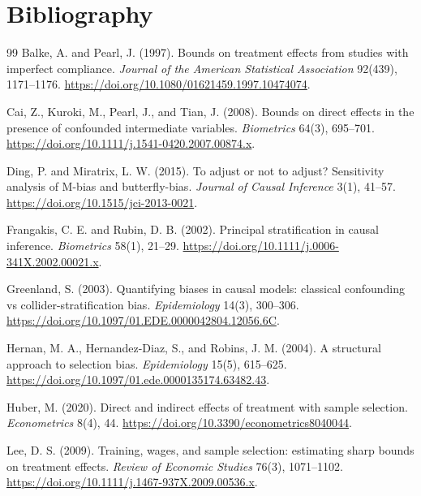 \documentclass[11pt]{article}
\theoremstyle{definition}
\theoremstyle{plain}
\theoremstyle{remark}
\begin{document}
\section*{Bibliography}
\begin{thebibliography}{99}
Balke, A. and Pearl, J. (1997).
Bounds on treatment effects from studies with imperfect compliance.
\emph{Journal of the American Statistical Association} 92(439), 1171--1176.
\url{https://doi.org/10.1080/01621459.1997.10474074}.

Cai, Z., Kuroki, M., Pearl, J., and Tian, J. (2008).
Bounds on direct effects in the presence of confounded intermediate variables.
\emph{Biometrics} 64(3), 695--701.
\url{https://doi.org/10.1111/j.1541-0420.2007.00874.x}.

Ding, P. and Miratrix, L. W. (2015).
To adjust or not to adjust? Sensitivity analysis of M-bias and butterfly-bias.
\emph{Journal of Causal Inference} 3(1), 41--57.
\url{https://doi.org/10.1515/jci-2013-0021}.

Frangakis, C. E. and Rubin, D. B. (2002).
Principal stratification in causal inference.
\emph{Biometrics} 58(1), 21--29.
\url{https://doi.org/10.1111/j.0006-341X.2002.00021.x}.

Greenland, S. (2003).
Quantifying biases in causal models: classical confounding vs collider-stratification bias.
\emph{Epidemiology} 14(3), 300--306.
\url{https://doi.org/10.1097/01.EDE.0000042804.12056.6C}.

Hernan, M. A., Hernandez-Diaz, S., and Robins, J. M. (2004).
A structural approach to selection bias.
\emph{Epidemiology} 15(5), 615--625.
\url{https://doi.org/10.1097/01.ede.0000135174.63482.43}.

Huber, M. (2020).
Direct and indirect effects of treatment with sample selection.
\emph{Econometrics} 8(4), 44.
\url{https://doi.org/10.3390/econometrics8040044}.

Lee, D. S. (2009).
Training, wages, and sample selection: estimating sharp bounds on treatment effects.
\emph{Review of Economic Studies} 76(3), 1071--1102.
\url{https://doi.org/10.1111/j.1467-937X.2009.00536.x}.


\end{thebibliography}
\end{document}
